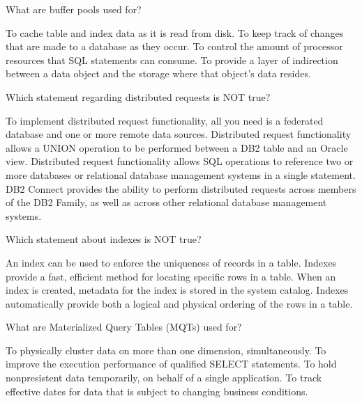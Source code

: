 \documentclass[11pt]{exam}
\begin{document}
\begin{questions}
\question[1]
What are buffer pools used for?
\begin{choices}
\choice To cache table and index data as it is read from disk.
\choice To keep track of changes that are made to a database as they occur.
\choice To control the amount of processor resources that SQL statements can consume.
\choice To provide a layer of indirection between a data object and the storage where that object's data
resides.
\end{choices}

\question[1]
Which statement regarding distributed requests is NOT true?
\begin{choices}
\choice To implement distributed request functionality, all you need is a federated database and one
or more remote data sources.
\choice Distributed request functionality allows a UNION operation to be performed between a DB2 table and
an Oracle view.
\choice Distributed request functionality allows SQL operations to reference two or more databases or 
relational database management systems in a single statement.
\choice DB2 Connect provides the ability to perform distributed requests across members of the DB2 Family,
as well as across other relational database management systems.
\end{choices}

\question[1]
Which statement about indexes is NOT true?
\begin{choices}
\choice An index can be used to enforce the uniqueness of records in a table.
\choice Indexes provide a fast, efficient method for locating specific rows in a table.
\choice When an index is created, metadata for the index is stored in the system catalog.
\choice Indexes automatically provide both a logical and physical ordering of the rows in a table.
\end{choices}

\question[1]
What are Materialized Query Tables (MQTs) used for?
\begin{choices}
\choice To physically cluster data on more than one dimension, simultaneously.
\choice To improve the execution performance of qualified SELECT statements.
\choice To hold nonpresistent data temporarily, on behalf of a single application.
\choice To track effective dates for data that is subject to changing business conditions.
\end{choices}


\end{questions}
\end{document}
